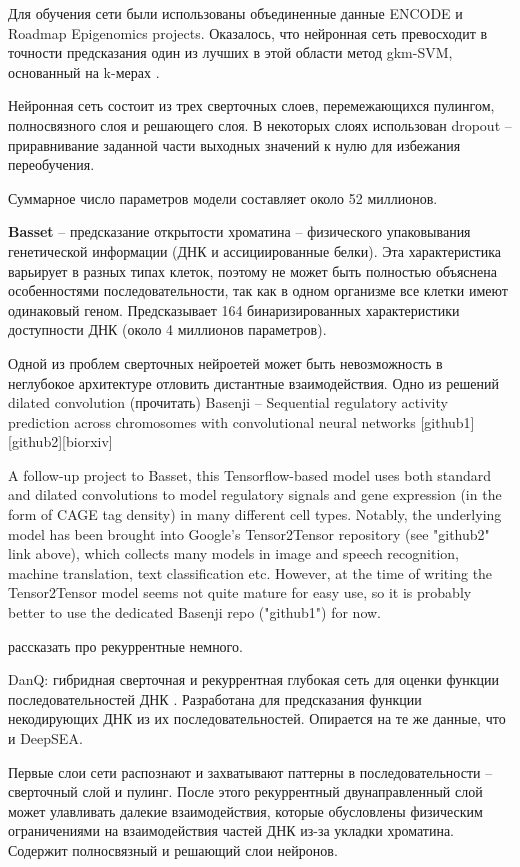 Для обучения сети были использованы объединенные данные ENCODE и Roadmap Epigenomics projects. Оказалось, что нейронная сеть превосходит в точности предсказания один из лучших в этой области метод gkm-SVM, основанный на k-мерах \cite{ghandi_enhanced_2014}.

Нейронная сеть состоит из трех сверточных слоев, перемежающихся пулингом, полносвязного слоя и решающего слоя. В некоторых слоях использован dropout -- приравнивание заданной части выходных значений к нулю для избежания переобучения.

Суммарное число параметров модели составляет около 52 миллионов.



{\bfseries Basset} -- предсказание открытости хроматина -- физического упаковывания генетической информации (ДНК и ассициированные белки). Эта характеристика варьирует в разных типах клеток, поэтому не может быть полностью объяснена особенностями последовательности, так как в одном организме все клетки имеют одинаковый геном.
Предсказывает 164 бинаризированных характеристики доступности ДНК (около 4 миллионов параметров).



Одной из проблем сверточных нейроетей может быть невозможность в неглубокое архитектуре отловить дистантные взаимодействия. Одно из решений dilated convolution (прочитать)
Basenji – Sequential regulatory activity prediction across chromosomes with convolutional neural networks [github1][github2][biorxiv]

A follow-up project to Basset, this Tensorflow-based model uses both standard and dilated convolutions to model regulatory signals and gene expression (in the form of CAGE tag density) in many different cell types. Notably, the underlying model has been brought into Google's Tensor2Tensor repository (see "github2" link above), which collects many models in image and speech recognition, machine translation, text classification etc. However, at the time of writing the Tensor2Tensor model seems not quite mature for easy use, so it is probably better to use the dedicated Basenji repo ("github1") for now.

рассказать про рекуррентные немного.


DanQ: гибридная сверточная и рекуррентная глубокая сеть для оценки функции последовательностей  ДНК \cite{quang_danq:_2016}. 
Разработана для предсказания функции некодирующих ДНК из их последовательностей. Опирается на те же данные, что и DeepSEA.

Первые слои сети распознают и захватывают паттерны в последовательности -- сверточный слой и пулинг. После этого рекуррентный двунаправленный слой может улавливать далекие взаимодействия, которые обусловлены физическим ограничениями на взаимодействия частей ДНК из-за укладки хроматина. Содержит полносвязный и решающий слои нейронов.


